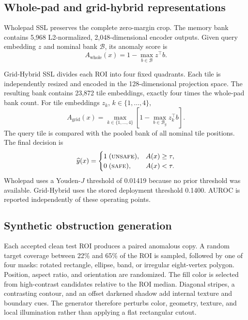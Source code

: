\documentclass[sigconf,nonacm]{acmart}
\begin{document}
\subsection{Whole-pad and grid-hybrid representations}
Wholepad SSL preserves the complete zero-margin crop. The memory bank contains 5,968 L2-normalized, 2,048-dimensional encoder outputs. Given query embedding $z$ and nominal bank $\mathcal{B}$, its anomaly score is
\begin{equation}
A_{\mathrm{whole}}(x)
=1-\max_{b\in\mathcal{B}} z^{\top}b.
\label{eq:whole}
\end{equation}

Grid-Hybrid SSL divides each ROI into four fixed quadrants. Each tile is independently resized and encoded in the 128-dimensional projection space. The resulting bank contains 23,872 tile embeddings, exactly four times the whole-pad bank count. For tile embeddings $z_k$, $k\in\{1,\ldots,4\}$,
\begin{equation}
A_{\mathrm{grid}}(x)
=\max_{k\in\{1,\ldots,4\}}
\left[1-\max_{b\in\mathcal{B}_g}z_k^{\top}b\right].
\label{eq:grid}
\end{equation}
The query tile is compared with the pooled bank of all nominal tile positions. The final decision is
\begin{equation}
\widehat{y}(x)=
\begin{cases}
1\;(\textsc{unsafe}), & A(x)\geq\tau,\\
0\;(\textsc{safe}), & A(x)<\tau.
\end{cases}
\label{eq:decision}
\end{equation}
Wholepad uses a Youden-$J$ threshold of 0.01419 because no prior threshold was available. Grid-Hybrid uses the stored deployment threshold 0.1400. AUROC is reported independently of these operating points.

\subsection{Synthetic obstruction generation}
Each accepted clean test ROI produces a paired anomalous copy. A random target coverage between 22\% and 65\% of the ROI is sampled, followed by one of four masks: rotated rectangle, ellipse, band, or irregular eight-vertex polygon. Position, aspect ratio, and orientation are randomized. The fill color is selected from high-contrast candidates relative to the ROI median. Diagonal stripes, a contrasting contour, and an offset darkened shadow add internal texture and boundary cues. The generator therefore perturbs color, geometry, texture, and local illumination rather than applying a flat rectangular cutout.
\end{document}
